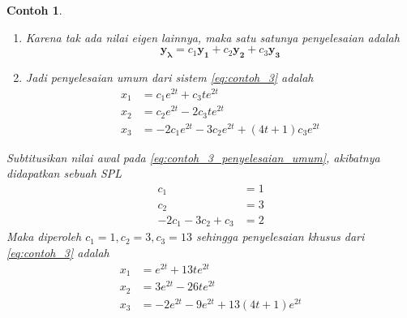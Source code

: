 \documentclass[a4paper]{article}
\theoremstyle{definisi}
\newtheorem{contoh}{Contoh}[section]
\numberwithin{equation}{section}
\begin{document}
\begin{contoh}
\begin{enumerate}[label=Langkah \arabic*: ,leftmargin=*]
\begin{align*}
\begin{pmatrix}
          1\\0\\-2
        \end{pmatrix}e^{2t}\\
        \mathbf{y_2}&=\begin{pmatrix}
          0\\1\\-3
        \end{pmatrix}e^{2t}\\
        \mathbf{y_3}&=\begin{pmatrix}
          1\\-2\\4
        \end{pmatrix}te^{2t}+\begin{pmatrix}
          0\\0\\1
        \end{pmatrix}e^{2t}
      \end{align*}
      \item Karena tak ada nilai eigen lainnya, maka satu satunya penyelesaian adalah
      \begin{equation*}
        \mathbf{y_\lambda}=c_1\mathbf{y_1}+c_2\mathbf{y_2}+c_3\mathbf{y_3}
      \end{equation*}
      \item Jadi penyelesaian umum dari sistem \eqref{eq:contoh_3} adalah
      \begin{equation}\label{eq:contoh_3_penyelesaian_umum}
        \begin{split}
          x_1&=c_1e^{2t}+c_3te^{2t}\\
          x_2&=c_2e^{2t}-2c_3te^{2t}\\
          x_3&=-2c_1e^{2t}-3c_2e^{2t}+(4t+1)c_3e^{2t}
        \end{split}
      \end{equation}
    \end{enumerate}
    Subtitusikan nilai awal pada \eqref{eq:contoh_3_penyelesaian_umum}, akibatnya didapatkan sebuah SPL
    \begin{equation*}
      \begin{split}
        c_1&=1\\
        c_2&=3\\
        -2c_1-3c_2+c_3&=2
      \end{split}
    \end{equation*}
    Maka diperoleh $c_1=1,c_2=3,c_3=13$ sehingga penyelesaian khusus dari \eqref{eq:contoh_3} adalah
    \begin{equation*}
      \begin{split}
        x_1&=e^{2t}+13te^{2t}\\
        x_2&=3e^{2t}-26te^{2t}\\
        x_3&=-2e^{2t}-9e^{2t}+13(4t+1)e^{2t}
      \end{split}
    \end{equation*}
  \end{contoh}
\end{document}
